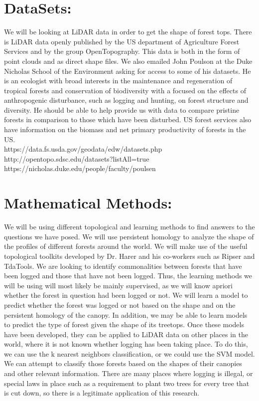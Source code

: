 \documentclass[11pt]{article}
\begin{document}
\section*{DataSets:}
We will be looking at LiDAR data in order to get the shape of forest tops. There is LiDAR data openly published by the US department of Agriculture Forest Services and by the group OpenTopography. This data is both in the form of point clouds and as direct shape files. We also emailed John Poulson at the Duke Nicholas School of the Environment asking for access to some of his datasets. He is an ecologist with broad interests in the maintenance and regeneration of tropical forests and conservation of biodiversity with a focused on the effects of anthropogenic disturbance, such as logging and hunting, on forest structure and diversity. He should be able to help provide us with data to compare pristine forests in comparison to those which have been disturbed. US forest services also have information on the biomass and net primary productivity of forests in the US.
\\
https://data.fs.usda.gov/geodata/edw/datasets.php\\
http://opentopo.sdsc.edu/datasets?listAll=true\\
https://nicholas.duke.edu/people/faculty/poulsen



\section*{Mathematical Methods:}
We will be using different topological and learning methods to find answers to the questions we have posed. We will use persistent homology to analyze the shape of the profiles of different forests around the world. We will make use of the useful topological toolkits developed by Dr. Harer and his co-workers such as Ripser and TdaTools. We are looking to identify commonalities between forests that have been logged and those that have not been logged. Thus, the learning methods we will be using will most likely be mainly supervised, as we will know apriori whether the forest in question had been logged or not. We will learn a model to predict whether the forest was logged or not based on the shape and on the persistent homology of the canopy. In addition, we may be able to learn models to predict the type of forest given the shape of its treetops. Once these models have been developed, they can be applied to LiDAR data on other places in the world, where it is not known whether logging has been taking place. To do this, we can use the k nearest neighbors classification, or we could use the SVM model. We can attempt to classify those forests based on the shapes of their canopies and other relevant information. There are many places where logging is illegal, or special laws in place such as a requirement to plant two trees for every tree that is cut down, so there is a legitimate application of this research.
\end{document}
